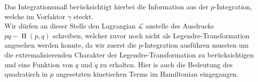  Das Integrationsmaß berücksichtigt hierbei die Information aus der $p$-Integration, welche im Vorfaktor $\gamma$ steckt. \\
 Wir dürfen an dieser Stelle den Lagrangian $\mathcal{L}$ anstelle des Ausdrucks \ $pq - \operatorname{H}(p,q)$ schreiben, welcher zuvor noch nicht als Legendre-Transformation angesehen werden konnte, da wir zuerst die $p$-Integration ausführen mussten um die extremalisierenden Charakter der Legendre-Transformation zu berücksichtigen  und eine Funktion von $q$ und $\dot{q}$ zu erhalten. Hier is auch die Bedeutung des quadratisch in $p$ angesetzten kinetischen Terms im Hamiltonian eingegangen. 